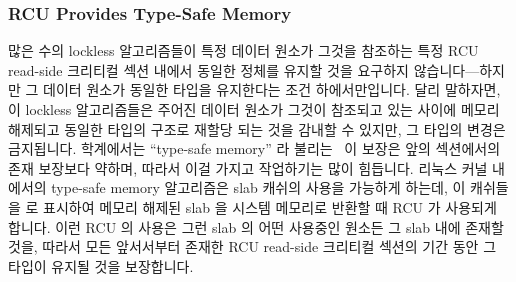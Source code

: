 \fi

\subsubsection{RCU Provides Type-Safe Memory}
\label{sec:defer:RCU Provides Type-Safe Memory}

많은 수의 lockless 알고리즘들이 특정 데이터 원소가 그것을 참조하는 특정 RCU
read-side 크리티컬 섹션 내에서 동일한 정체를 유지할 것을 요구하지
않습니다---하지만 그 데이터 원소가 동일한 타입을 유지한다는 조건
하에서만입니다.
달리 말하자면, 이 lockless 알고리즘들은 주어진 데이터 원소가 그것이 참조되고
있는 사이에 메모리 해제되고 동일한 타입의 구조로 재할당 되는 것을 감내할 수
있지만, 그 타입의 변경은 금지됩니다.
학계에서는 ``type-safe memory'' 라 불리는~\cite{Cheriton96a} 이 보장은 앞의
섹션에서의 존재 보장보다 약하며, 따라서 이걸 가지고 작업하기는 많이 힘듭니다.
리눅스 커널 내에서의 type-safe memory 알고리즘은 slab 캐쉬의 사용을 가능하게
하는데, 이 캐쉬들을  로 표시하여 메모리 해제된 slab 을
시스템 메모리로 반환할 때 RCU 가 사용되게 합니다.
이런 RCU 의 사용은 그런 slab 의 어떤 사용중인 원소든 그 slab 내에 존재할 것을,
따라서 모든 앞서서부터 존재한 RCU read-side 크리티컬 섹션의 기간 동안 그 타입이
유지될 것을 보장합니다.

